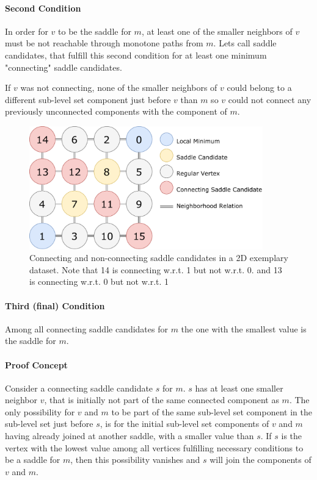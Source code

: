 \documentclass{scrartcl}
\begin{document}
\paragraph{Second Condition} In order for \(v\) to be the saddle for \(m\), at least one of the smaller neighbors of \(v\) must be not reachable through monotone paths from \(m\). Lets call saddle candidates, that fulfill this second condition for at least one minimum "connecting" saddle candidates.

If \(v\) was not connecting, none of the smaller neighbors of \(v\) could belong to a different sub-level set component just before \(v\) than \(m\) so \(v\) could not connect any previously unconnected components with the component of \(m\).

\begin{figure}[h!]
\centering
\includegraphics[width=0.9\textwidth]{figures/ConnectedSaddleCandidates.pdf}
\caption{Connecting and non-connecting saddle candidates in a 2D exemplary dataset. Note that 14 is connecting w.r.t. 1 but not w.r.t. 0. and 13 is connecting w.r.t. 0 but not w.r.t. 1}
\label{fig:csc}
\end{figure}

\paragraph{Third (final) Condition} Among all connecting saddle candidates for \(m\) the one with the smallest value is the saddle for \(m\).

\paragraph{Proof Concept}
Consider a connecting saddle candidate \(s\) for \(m\). \(s\) has at least one smaller neighbor \(v\), that is initially not part of the same connected component as \(m\). The only possibility for \(v\) and \(m\) to be part of the same sub-level set component in the sub-level set just before \(s\), is for the initial sub-level set components of \(v\) and \(m\) having already joined at another saddle, with a smaller value than \(s\). If \(s\) is the vertex with the lowest value among all vertices fulfilling necessary conditions to be a saddle for \(m\), then this possibility vanishes and \(s\) will join the components of \(v\) and \(m\).
\end{document}
